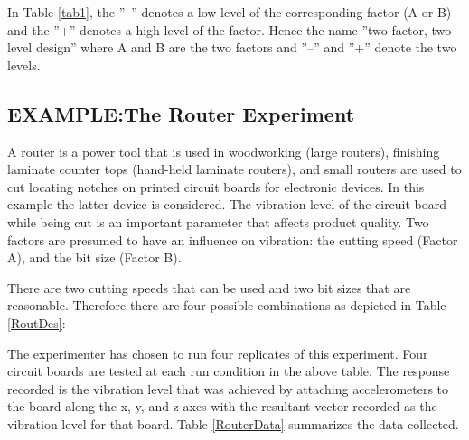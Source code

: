 In Table \ref{tab1}, the ''--'' denotes a low level of the corresponding factor (A or B) and the ''+'' denotes a high level of the factor.  Hence the name ''two-factor, two-level design'' where A and B are the two factors and ''--'' and ''+'' denote the two levels.

\subsection{EXAMPLE:The Router Experiment} 
\label{router}
A router is a power tool that is used in woodworking (large routers), finishing laminate counter tops (hand-held laminate routers), and small routers are used to cut locating notches on printed circuit boards for electronic devices. In this example the latter device is considered.  The vibration level of the circuit board while being cut is an important parameter that affects product quality.  Two factors are presumed to have an influence on vibration: the cutting speed (Factor A), and the bit size (Factor B).

There are two cutting speeds that can be used and two bit sizes that are reasonable.  Therefore there are four possible combinations as depicted in Table \ref{RoutDes}:



The experimenter has chosen to run four replicates of this experiment.  Four circuit boards are tested at each run condition in the above table.  The response recorded is the vibration level that was achieved by attaching accelerometers to the board along the x, y, and z axes with the resultant vector recorded as the vibration level for that board.  Table \ref{RouterData} summarizes the data collected.

